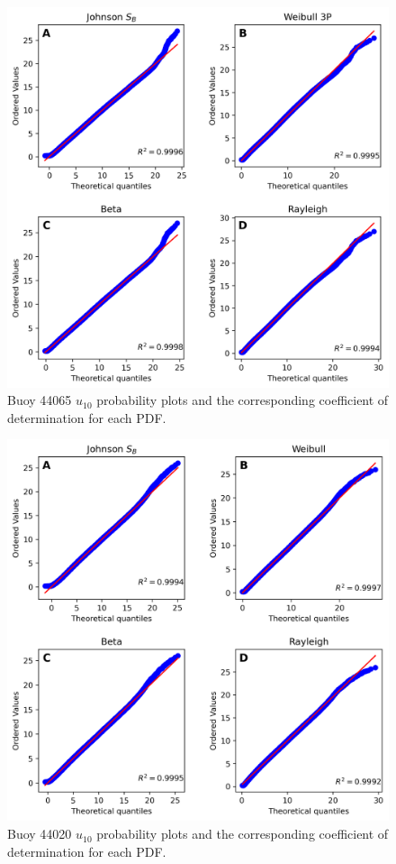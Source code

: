 \begin{figure}[H]
\centering
\includegraphics[width=0.68\linewidth]{Figures/Chapter5/b44065_wind_probplot.png}
\caption{Buoy 44065 $u_{10}$ probability plots and the corresponding coefficient of determination for each PDF.}
\label{fig:b44065_probplot}
\end{figure}



\begin{figure}[H]
\centering
\includegraphics[width=0.68\linewidth]{Figures/Chapter5/b44020_wind_probplot.png}
\caption{Buoy 44020 $u_{10}$ probability plots and the corresponding coefficient of determination for each PDF.}
\label{fig:b44020_probplot}
\end{figure}





